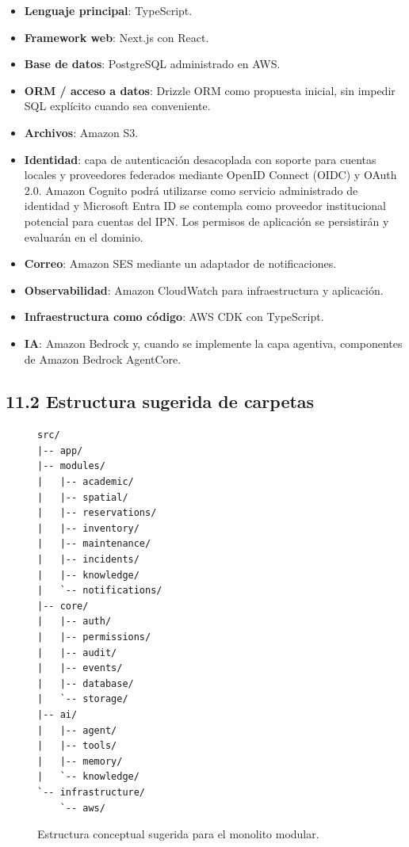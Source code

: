 \documentclass[12pt]{article}
\begin{document}
\begin{itemize}[leftmargin=1.2cm]
    \item \textbf{Lenguaje principal}: TypeScript.
    \item \textbf{Framework web}: Next.js con React.
    \item \textbf{Base de datos}: PostgreSQL administrado en AWS.
    \item \textbf{ORM / acceso a datos}: Drizzle ORM como propuesta inicial, sin impedir SQL explícito cuando sea conveniente.
    \item \textbf{Archivos}: Amazon S3.
    \item \textbf{Identidad}: capa de autenticación desacoplada con soporte para cuentas locales y proveedores federados mediante OpenID Connect (OIDC) y OAuth 2.0. Amazon Cognito podrá utilizarse como servicio administrado de identidad y Microsoft Entra ID se contempla como proveedor institucional potencial para cuentas del IPN. Los permisos de aplicación se persistirán y evaluarán en el dominio.
    \item \textbf{Correo}: Amazon SES mediante un adaptador de notificaciones.
    \item \textbf{Observabilidad}: Amazon CloudWatch para infraestructura y aplicación.
    \item \textbf{Infraestructura como código}: AWS CDK con TypeScript.
    \item \textbf{IA}: Amazon Bedrock y, cuando se implemente la capa agentiva, componentes de Amazon Bedrock AgentCore.
\end{itemize}

\subsection*{11.2 Estructura sugerida de carpetas}

\begin{figure}[H]
\centering
\begin{minipage}{0.9\textwidth}
\footnotesize
\begin{verbatim}
src/
|-- app/
|-- modules/
|   |-- academic/
|   |-- spatial/
|   |-- reservations/
|   |-- inventory/
|   |-- maintenance/
|   |-- incidents/
|   |-- knowledge/
|   `-- notifications/
|-- core/
|   |-- auth/
|   |-- permissions/
|   |-- audit/
|   |-- events/
|   |-- database/
|   `-- storage/
|-- ai/
|   |-- agent/
|   |-- tools/
|   |-- memory/
|   `-- knowledge/
`-- infrastructure/
    `-- aws/
\end{verbatim}
\end{minipage}
\caption{Estructura conceptual sugerida para el monolito modular.}
\end{figure}
\end{document}
